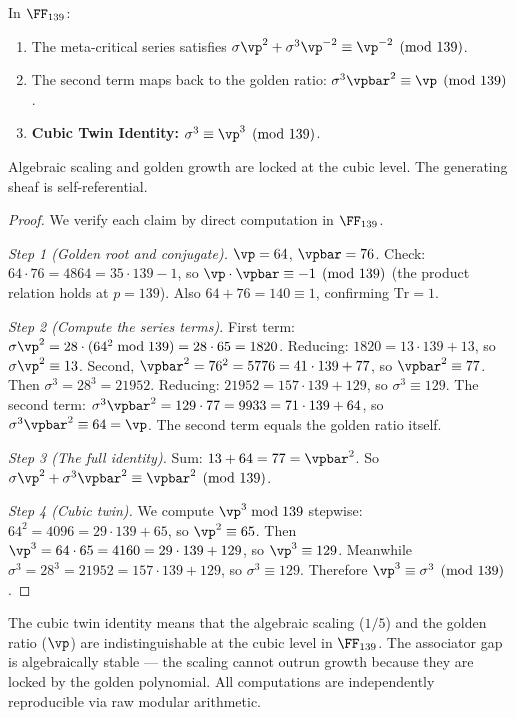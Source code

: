 \begin{theorem}\label{thm:metacritical}
In $\FF_{139}$:
\begin{enumerate}
\item The meta-critical series satisfies $\sigma \vp^2 + \sigma^3 \vp^{-2} \equiv \vp^{-2} \pmod{139}$.
\item The second term maps back to the golden ratio: $\sigma^3 \vpbar^2 \equiv \vp \pmod{139}$.
\item \textbf{Cubic Twin Identity:} $\sigma^3 \equiv \vp^3 \pmod{139}$.
\end{enumerate}
Algebraic scaling and golden growth are locked at the cubic level. The generating sheaf is self-referential.
\end{theorem}

\begin{proof}
We verify each claim by direct computation in $\FF_{139}$.

\emph{Step 1 (Golden root and conjugate).} $\vp = 64$, $\vpbar = 76$. Check: $64 \cdot 76 = 4864 = 35 \cdot 139 - 1$, so $\vp \cdot \vpbar \equiv -1 \pmod{139}$ (the product relation holds at $p = 139$). Also $64 + 76 = 140 \equiv 1$, confirming $\mathrm{Tr} = 1$.

\emph{Step 2 (Compute the series terms).} First term: $\sigma \vp^2 = 28 \cdot (64^2 \bmod 139) = 28 \cdot 65 = 1820$. Reducing: $1820 = 13 \cdot 139 + 13$, so $\sigma \vp^2 \equiv 13$. Second, $\vpbar^2 = 76^2 = 5776 = 41 \cdot 139 + 77$, so $\vpbar^2 \equiv 77$. Then $\sigma^3 = 28^3 = 21952$. Reducing: $21952 = 157 \cdot 139 + 129$, so $\sigma^3 \equiv 129$. The second term: $\sigma^3 \vpbar^2 = 129 \cdot 77 = 9933 = 71 \cdot 139 + 64$, so $\sigma^3 \vpbar^2 \equiv 64 = \vp$. The second term equals the golden ratio itself.

\emph{Step 3 (The full identity).} Sum: $13 + 64 = 77 = \vpbar^2$. So $\sigma\vp^2 + \sigma^3\vpbar^2 \equiv \vpbar^2 \pmod{139}$.

\emph{Step 4 (Cubic twin).} We compute $\vp^3 \bmod 139$ stepwise: $64^2 = 4096 = 29 \cdot 139 + 65$, so $\vp^2 \equiv 65$. Then $\vp^3 = 64 \cdot 65 = 4160 = 29 \cdot 139 + 129$, so $\vp^3 \equiv 129$. Meanwhile $\sigma^3 = 28^3 = 21952 = 157 \cdot 139 + 129$, so $\sigma^3 \equiv 129$. Therefore $\vp^3 \equiv \sigma^3 \pmod{139}$. \qedhere
\end{proof}

\begin{remark}
The cubic twin identity means that the algebraic scaling ($1/5$) and the golden ratio ($\vp$) are indistinguishable at the cubic level in $\FF_{139}$. The associator gap is algebraically stable --- the scaling cannot outrun growth because they are locked by the golden polynomial. All computations are independently reproducible via raw modular arithmetic.
\end{remark}


